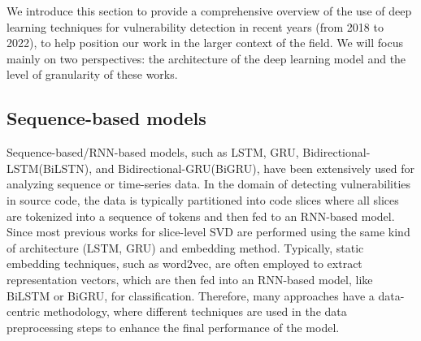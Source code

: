 \documentclass{ieeeaccess}
\begin{document}
\par  We introduce this section to provide a comprehensive overview of the use of deep learning techniques for vulnerability detection in recent years (from 2018 to 2022), to help position our work in the larger context of the field. We will focus mainly on two perspectives: the architecture of the deep learning model and the level of granularity of these works.

\subsection{Sequence-based models}
\par  Sequence-based/RNN-based models, such as LSTM\cite{LSTM}, GRU\cite{GRU}, Bidirectional-LSTM(BiLSTN), and Bidirectional-GRU(BiGRU), have been extensively used for analyzing sequence or time-series data. In the domain of detecting vulnerabilities in source code, the data is typically partitioned into code slices where all slices are tokenized into a sequence of tokens and then fed to an RNN-based model. Since most previous works\cite{vuldeekeeper,vuldeepeeker2,SySeVR,VulDeeLocator,VUDENC} for slice-level SVD are performed using the same kind of architecture (LSTM, GRU) and embedding method. Typically,  static embedding techniques, such as word2vec\cite{word2vec}, are often employed to extract representation vectors, which are then fed into an RNN-based model, like BiLSTM or BiGRU, for classification. Therefore, many approaches have a data-centric methodology, where different techniques are used in the data preprocessing steps to enhance the final performance of the model. 
\end{document}
